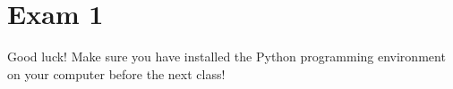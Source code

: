 

{\let\clearpage\relax\chapter{Exam 1}}

Good luck!  Make sure you have installed the Python programming environment on your computer before the next class!